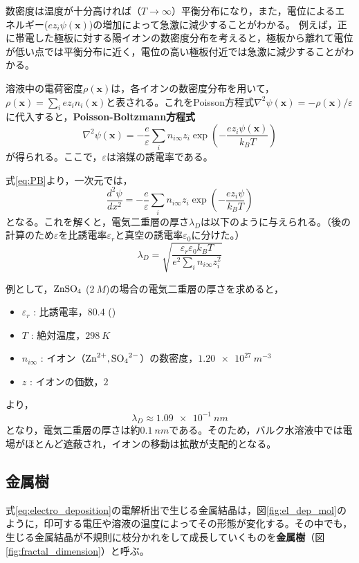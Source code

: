 \documentclass[autodetect-engine,dvi=dvipdfmx,a4paper,ja=standard,oneside,openany,11pt,draft]{bxjsbook}
\begin{document}
数密度は温度が十分高ければ（$T\to\infty$）平衡分布になり，また，電位によるエネルギー($ez_i\psi(\bm{x})$)の増加によって急激に減少することがわかる。
例えば，正に帯電した極板に対する陽イオンの数密度分布を考えると，極板から離れて電位が低い点では平衡分布に近く，電位の高い極板付近では急激に減少することがわかる。

溶液中の電荷密度$\rho(\bm{x})$は，各イオンの数密度分布を用いて，$\rho(\bm{x})=\sum_{i}ez_in_i(\bm{x})$と表される。これをPoisson方程式$\nabla^2\psi(\bm{x})=-\rho(\bm{x})/\varepsilon$に代入すると，\textbf{Poisson-Boltzmann方程式}
\begin{equation}
  \nabla^2\psi(\bm{x}) = -\frac{e}{\varepsilon}\sum_{i}n_{i\infty}z_i\exp(-\frac{ez_i\psi(\bm{x})}{k_BT})
  \label{eq:PB}
\end{equation}
が得られる。ここで，$\varepsilon$は溶媒の誘電率である。

式\eqref{eq:PB}より，一次元では，
\begin{equation}
  \frac{d^2\psi}{dx^2} = -\frac{e}{\varepsilon}\sum_{i}n_{i\infty}z_i\exp(-\frac{ez_i\psi}{k_BT})
  \label{eq:PB_1D}
\end{equation}
となる。これを解くと，電気二重層の厚さ$\lambda_D$は以下のように与えられる。（後の計算のため$\varepsilon$を比誘電率$\varepsilon_r$と真空の誘電率$\varepsilon_0$に分けた。）
\begin{equation}
  \lambda_D = \sqrt{\frac{\varepsilon_r\varepsilon_0 k_BT}{e^2\sum_{i}n_{i\infty}z_i^2}}\label{eq:debye_length}
\end{equation}

例として，$\ce{ZnSO_4}$ ($\SI{2}{M}$)の場合の電気二重層の厚さを求めると，
\begin{itemize}
  \item $\varepsilon_r$ : 比誘電率，$80.4$ ()
  \item $T$ : 絶対温度，$\SI{298}{K}$
  \item $n_{i\infty}$ : イオン（$\ce{Zn^{2+},SO_4^{2-}}$）の数密度，$\SI{1.20e27}{m^{-3}}$
  \item $z$ : イオンの価数，$2$
\end{itemize}
より，
\begin{equation}
  \lambda_D\approx \SI{1.09e-1}{nm}
\end{equation}
となり，電気二重層の厚さは約$\SI{0.1}{nm}$である。そのため，バルク水溶液中では電場がほとんど遮蔽され，イオンの移動は拡散が支配的となる。
\subsection{金属樹}
式\eqref{eq:electro_deposition}の電解析出で生じる金属結晶は，図\ref{fig:el_dep_mol}のように，印可する電圧や溶液の温度によってその形態が変化する\cite{suda2003temperature}。その中でも，生じる金属結晶が不規則に枝分かれをして成長していくものを\textbf{金属樹}（図\ref{fig:fractal_dimension}）と呼ぶ。
\end{document}
